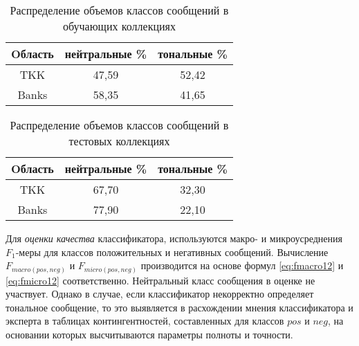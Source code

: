     \begin{table}[H]
        \centering
        \caption{Распределение объемов классов сообщений в обучающих коллекциях}
        \label{table:trainTableStat}
        \begin{tabular}{|c|c|c|}
            \hline
            Oбласть     & нейтральные \%    & тональные  \%     \\ \hline
             TKK        & 47,59             & 52,42             \\ \hline
             Banks      & 58,35             & 41,65             \\ \hline
        \end{tabular}
     \end{table}

    \begin{table}[H]
        \centering
        \caption{Распределение объемов классов сообщений в тестовых коллекциях}
        \label{table:testTableStat}
        \begin{tabular}{|c|c|c|}
            \hline
            Oбласть     & нейтральные \%    & тональные  \%     \\ \hline
             TKK        & 67,70             & 32,30             \\ \hline
             Banks      & 77,90             & 22,10             \\ \hline
        \end{tabular}
     \end{table}
    Для {\it оценки качества} классификатора, используются макро- и микроусреднения
    $F_1$-меры для классов положительных и негативных сообщений. Вычисление
    $F_{macro(pos, neg)}$ и $F_{micro(pos, neg)}$ производится на основе
    формул \ref{eq:fmacro12} и \ref{eq:fmicro12} соответственно. Нейтральный
    класс сообщения в оценке не участвует. Однако в случае, если классификатор
    некорректно определяет тональное сообщение, то это выявляется в расхождении
    мнения классификатора и эксперта в таблицах контингентностей, составленных для
    классов $pos$ и $neg$, на основании которых высчитываются параметры полноты
    и точности.

